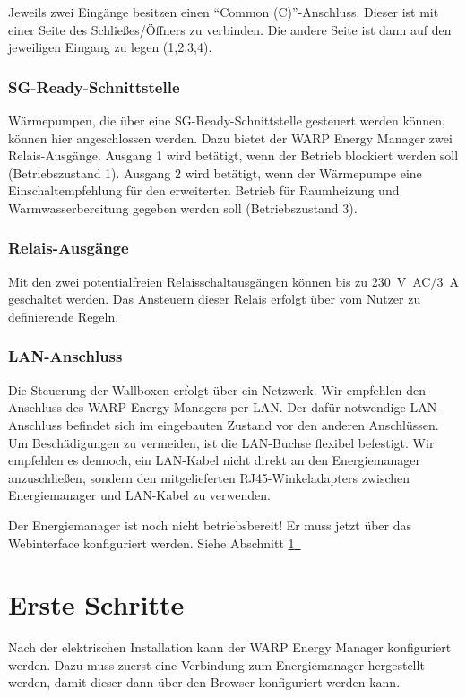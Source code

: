 \documentclass[a4paper,10pt]{article}
\newcommand{\hint}[1]{\begin{tcolorbox}[colback=boxgray,colframe=black,coltext=
white,title=Hinweis,left*=2mm,right*=2mm,boxsep=1mm,bottom=1mm,top=1mm]#1\end{tcolorbox}}
\newcommand*{\fullref}[1]{Abschnitt \hyperref[{#1}]{\ref*{#1}~\nameref*{#1}}}
\begin{document}
\begin{multicols*}{2}
    Jeweils zwei Eingänge besitzen einen \enquote{Common (C)}-Anschluss. Dieser ist mit einer Seite des Schließes/Öffners
    zu verbinden. Die andere Seite ist dann auf den jeweiligen Eingang zu legen (1,2,3,4).

	\subsubsection{SG-Ready-Schnittstelle}
    Wärmepumpen, die über eine SG-Ready-Schnittstelle gesteuert werden können, können hier angeschlossen werden.
    Dazu bietet der WARP Energy Manager zwei Relais-Ausgänge.
    Ausgang 1 wird betätigt, wenn der Betrieb blockiert werden soll (Betriebszustand 1).
    Ausgang 2 wird betätigt, wenn der Wärmepumpe eine Einschaltempfehlung für den erweiterten Betrieb
    für Raumheizung und Warmwasserbereitung gegeben werden soll (Betriebszustand 3).

	\subsubsection{Relais-Ausgänge}
	Mit den zwei potentialfreien Relaisschaltausgängen können bis zu \SI{230}{\volt AC}/\SI{3}{\ampere} geschaltet
	werden. Das Ansteuern dieser Relais erfolgt über vom Nutzer zu definierende Regeln.

	\subsubsection{LAN-Anschluss}
	Die Steuerung der Wallboxen erfolgt über ein Netzwerk. Wir empfehlen den
	Anschluss des WARP Energy Managers per LAN. Der dafür notwendige LAN-Anschluss
	befindet sich im eingebauten Zustand vor den anderen Anschlüssen. Um Beschädigungen
	zu vermeiden, ist die LAN-Buchse flexibel befestigt. Wir empfehlen es dennoch, ein LAN-Kabel
	nicht direkt an den Energiemanager anzuschließen, sondern den mitgelieferten RJ45-Winkeladapters zwischen Energiemanager und LAN-Kabel zu verwenden.

	\hint{Der Energiemanager ist noch nicht betriebsbereit! Er muss jetzt über das Webinterface konfiguriert werden. Siehe \fullref{setup}}

	\vfill
	\null
	\newpage
	\section{Erste Schritte}
	\label{setup}

	Nach der elektrischen Installation kann der WARP Energy Manager konfiguriert
	werden. Dazu muss zuerst eine Verbindung zum Energiemanager hergestellt werden,
	damit dieser dann über den Browser konfiguriert werden kann.


\end{multicols*}
\end{document}
